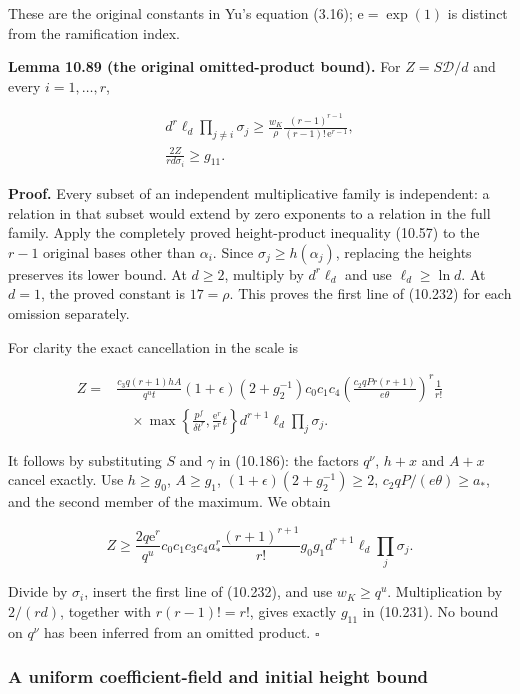 \documentclass[
  11pt,
  a4paper,
]{article}
\begin{document}
These are the original constants in Yu's equation (3.16);
\(\mathrm e=\exp(1)\) is distinct from the ramification index.

\textbf{Lemma 10.89 (the original omitted-product bound).} For
\(Z=S\mathcal D/d\) and every \(i=1,\ldots,r\),

\[
\begin{gathered}
d^r\ell_d\prod_{j\ne i}\sigma_j
\ge\frac{w_K}{\rho}
\frac{(r-1)^{r-1}}{(r-1)!\,\mathrm e^{r-1}},\\
\frac{2Z}{rd\sigma_i}\ge g_{11}.
\end{gathered}
\tag{10.232}
\]

\textbf{Proof.} Every subset of an independent multiplicative family is
independent: a relation in that subset would extend by zero exponents to
a relation in the full family. Apply the completely proved
height-product inequality (10.57) to the \(r-1\) original bases other
than \(\alpha_i\). Since \(\sigma_j\ge h(\alpha_j)\), replacing the
heights preserves its lower bound. At \(d\ge2\), multiply by
\(d^r\ell_d\) and use \(\ell_d\ge\ln d\). At \(d=1\), the proved
constant is \(17=\rho\). This proves the first line of (10.232) for each
omission separately.

For clarity the exact cancellation in the scale is

\[
\begin{aligned}
Z={}&\frac{c_3q(r+1)hA}{q^ut}
(1+\epsilon)(2+g_2^{-1})c_0c_1c_4
\left(\frac{c_2qPr(r+1)}{e\theta}\right)^r\frac1{r!}\\
&\quad{}\times
\max\left\{\frac{p^f}{\delta t^r},
\frac{\mathrm e^r}{r^r}t\right\}
d^{r+1}\ell_d\prod_j\sigma_j.
\end{aligned}
\tag{10.233}
\]

It follows by substituting \(S\) and \(\gamma\) in (10.186): the factors
\(q^\nu\), \(h+x\) and \(A+x\) cancel exactly. Use \(h\ge g_0\),
\(A\ge g_1\), \((1+\epsilon)(2+g_2^{-1})\ge2\),
\(c_2qP/(e\theta)\ge a_*\), and the second member of the maximum. We
obtain

\[
Z\ge
\frac{2q\mathrm e^r}{q^u}
c_0c_1c_3c_4a_*^r
\frac{(r+1)^{r+1}}{r!}g_0g_1
d^{r+1}\ell_d\prod_j\sigma_j.
\]

Divide by \(\sigma_i\), insert the first line of (10.232), and use
\(w_K\ge q^u\). Multiplication by \(2/(rd)\), together with
\(r(r-1)!=r!\), gives exactly \(g_{11}\) in (10.231). No bound on
\(q^\nu\) has been inferred from an omitted product. \(\square\)

\subsubsection{A uniform coefficient-field and initial height
bound}\label{a-uniform-coefficient-field-and-initial-height-bound}
\end{document}
